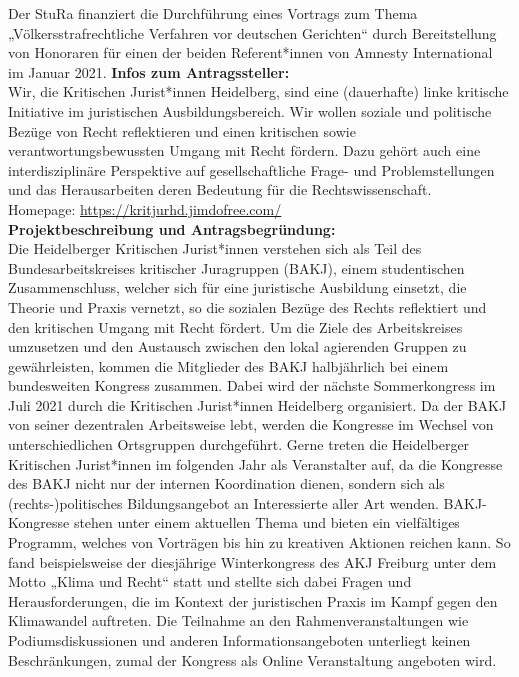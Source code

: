 {
    Der StuRa finanziert die Durchführung eines Vortrags zum Thema „Völkersstrafrechtliche Verfahren vor deutschen Gerichten“ durch Bereitstellung von Honoraren für einen der beiden Referent*innen von Amnesty International im Januar 2021.
}{
    \textbf{Infos zum Antragssteller:}\\
    Wir, die Kritischen Jurist*innen Heidelberg, sind eine (dauerhafte) linke kritische Initiative im juristischen Ausbildungsbereich. Wir wollen soziale und politische Bezüge von Recht reflektieren und einen kritischen sowie verantwortungsbewussten Umgang mit Recht fördern. Dazu gehört auch eine interdisziplinäre Perspektive auf gesellschaftliche Frage- und Problemstellungen und das Herausarbeiten deren Bedeutung für die Rechtswissenschaft.\\
    Homepage: \url{https://kritjurhd.jimdofree.com/}\\[1em]
    \textbf{Projektbeschreibung und Antragsbegründung:}\\
    Die Heidelberger Kritischen Jurist*innen verstehen sich als Teil des Bundesarbeitskreises kritischer Juragruppen (BAKJ), einem studentischen Zusammenschluss, welcher sich für eine juristische Ausbildung einsetzt, die Theorie und Praxis vernetzt, so die sozialen Bezüge des Rechts reflektiert und den kritischen Umgang mit Recht fördert.
    Um die Ziele des Arbeitskreises umzusetzen und den Austausch zwischen den lokal agierenden Gruppen zu gewährleisten, kommen die Mitglieder des BAKJ halbjährlich bei einem bundesweiten Kongress zusammen. Dabei wird der nächste Sommerkongress im Juli 2021 durch die Kritischen Jurist*innen Heidelberg organisiert.
    Da der BAKJ von seiner dezentralen Arbeitsweise lebt, werden die Kongresse im Wechsel von unterschiedlichen Ortsgruppen durchgeführt. Gerne treten die Heidelberger Kritischen Jurist*innen im folgenden Jahr als Veranstalter auf, da die Kongresse des BAKJ nicht nur der internen Koordination dienen, sondern sich als (rechts-)politisches Bildungsangebot an Interessierte aller Art wenden. BAKJ-Kongresse stehen unter einem aktuellen Thema und bieten ein vielfältiges Programm, welches von Vorträgen bis hin zu kreativen Aktionen reichen kann. So fand beispielsweise der diesjährige Winterkongress des AKJ Freiburg unter dem Motto „Klima und Recht“ statt und stellte sich dabei Fragen und Herausforderungen, die im Kontext der juristischen Praxis im Kampf gegen den Klimawandel auftreten.
    Die Teilnahme an den Rahmenveranstaltungen wie Podiumsdiskussionen und anderen Informationsangeboten unterliegt keinen Beschränkungen, zumal der Kongress als Online Veranstaltung angeboten wird.
}
